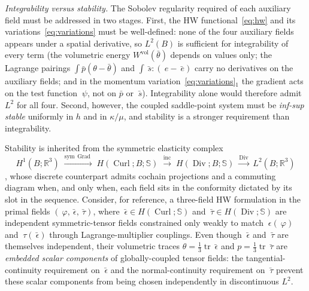 \documentclass[12pt]{article}
\newcommand{\eps}{~\epsilon}
\newcommand{\epsbar}{\bar{~\epsilon}}
\newcommand{\edev}{~e}
\newcommand{\ebar}{\bar{~e}}
\newcommand{\btau}{~\tau}
\newcommand{\btaubar}{\bar{~\tau}}
\newcommand{\sbar}{\bar{~s}}
\newcommand{\thbar}{\bar{\theta}}
\newcommand{\pbar}{\bar{p}}
\newcommand{\Syms}{\mathbb{S}}
\newcommand{\supvol}{^{\mathrm{vol}}}
\DeclareMathOperator{\trace}{tr}
\DeclareMathOperator{\Div}{Div}
\DeclareMathOperator{\Grad}{Grad}
\DeclareMathOperator{\Curl}{Curl}
\begin{document}
\textit{Integrability versus stability.} The Sobolev regularity
required of each auxiliary field must be addressed in two stages.
First, the HW functional~\eqref{eq:hw} and its
variations~\eqref{eq:variations} must be well-defined: none of the
four auxiliary fields appears under a spatial derivative, so
$L^2(B)$ is sufficient for integrability of every term (the volumetric
energy $W\supvol(\thbar)$ depends on values only; the Lagrange
pairings $\int \pbar(\theta - \thbar)$ and $\int \sbar:(\edev -
\ebar)$ carry no derivatives on the auxiliary fields; and in the
momentum variation~\eqref{eq:variations}$_1$ the gradient acts on
the test function $~\psi$, not on $\pbar$ or $\sbar$). Integrability
alone would therefore admit $L^2$ for all four. Second, however, the
coupled saddle-point system must be \emph{inf-sup stable} uniformly
in $h$ and in $\kappa/\mu$, and stability is a stronger requirement
than integrability.

Stability is inherited from the symmetric elasticity complex
\begin{equation}
  \label{eq:elasticity-complex}
  H^1(B; \mathbb{R}^3)
  \;\xrightarrow{\mathrm{sym}\,\Grad}\;
  H(\Curl; B; \Syms)
  \;\xrightarrow{\mathrm{inc}}\;
  H(\Div; B; \Syms)
  \;\xrightarrow{\Div}\;
  L^2(B; \mathbb{R}^3)
\end{equation}
\citep{Arnold.Falk.Winther:2006a,Arnold.Falk.Winther:2010}, whose
discrete counterpart admits cochain projections and a commuting
diagram when, and only when, each field sits in the conformity
dictated by its slot in the sequence. Consider, for reference, a
three-field HW formulation in the primal fields
$(~\varphi, \epsbar, \btaubar)$, where $\epsbar \in H(\Curl; \Syms)$
and $\btaubar \in H(\Div; \Syms)$ are independent symmetric-tensor
fields constrained only weakly to match $\eps(~\varphi)$ and
$\btau(\epsbar)$ through Lagrange-multiplier couplings. Even though
$\epsbar$ and $\btaubar$ are themselves independent, their
volumetric traces $\theta = \tfrac{1}{3}\trace \epsbar$ and $p =
\tfrac{1}{3}\trace \btaubar$ are \emph{embedded scalar components}
of globally-coupled tensor fields: the tangential-continuity
requirement on $\epsbar$ and the normal-continuity requirement on
$\btaubar$ prevent these scalar components from being chosen
independently in discontinuous $L^2$.
\end{document}
